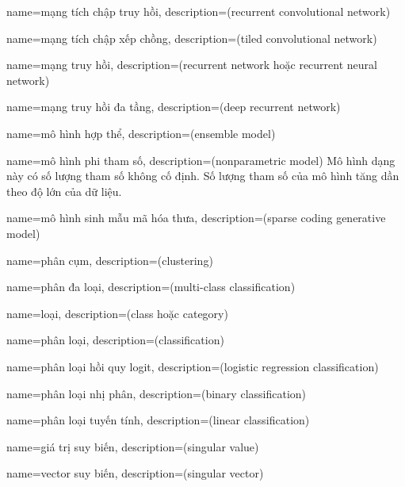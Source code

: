 {
    name={mạng tích chập truy hồi},
    description={(recurrent convolutional network)}
}

{
    name={mạng tích chập xếp chồng},
    description={(tiled convolutional network)}
}

{
    name={mạng truy hồi},
    description={(recurrent network hoặc recurrent neural network)}
}

{
    name={mạng truy hồi đa tầng},
    description={(deep recurrent network)}
}

{
    name={mô hình hợp thể},
    description={(ensemble model)}
}

{
    name={mô hình phi tham số},
    description={(nonparametric model) Mô hình dạng này có số lượng
    tham số không cố định. Số lượng tham số của mô hình tăng dần
    theo độ lớn của dữ liệu.}
}

{
    name={mô hình sinh mẫu mã hóa thưa},
    description={(sparse coding generative model)}
}

{
    name={phân cụm},
    description={(clustering)}
}

{
    name={phân đa loại},
    description={(multi-class classification)}
}

{
    name={loại},
    description={(class hoặc category)}
}

{
    name={phân loại},
    description={(classification)}
}

{
    name={phân loại hồi quy logit},
    description={(logistic regression classification)}
}

{
    name={phân loại nhị phân},
    description={(binary classification)}
}

{
    name={phân loại tuyến tính},
    description={(linear classification)}
}

{
    name={giá trị suy biến},
    description={(singular value)}
}

{
    name={vector suy biến},
    description={(singular vector)}
}

